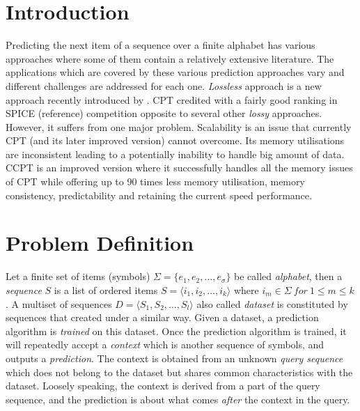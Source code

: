 \begin{comment}
							

\end{comment}

\section{Introduction}
Predicting the next item of a sequence over a finite alphabet has various approaches where some of them contain a relatively extensive literature. The applications which are covered by these various prediction approaches vary and different challenges are addressed for each one. \emph{Lossless} approach is a new approach  recently introduced by \citeauthor{gueniche_fournier-viger_tseng_2013} \citeyear{gueniche_fournier-viger_tseng_2013}. CPT credited with a fairly good ranking in SPICE (reference) competition opposite to several other \emph{lossy} approaches. However, it suffers from one major problem. Scalability is an issue that currently CPT (and its later improved version) cannot overcome. Its memory utilisations are inconsistent leading to a potentially inability to handle big amount of data. CCPT is an improved version where it successfully handles all the memory issues of CPT while offering up to 90 times less memory utilisation, memory consistency, predictability and retaining the current speed performance.
\section{Problem Definition}
Let a finite set of items (symbols) \(\Sigma = \{e_1, e_2,\ldots,e_\sigma\}\) be called \emph{alphabet}, then a \emph{sequence} \(S\) is a list of ordered items \(S=\langle i_1,i_2,\ldots,i_k\rangle\) where \(i_m \in \Sigma\ for\ 1\leq m \leq k\). A multiset of sequences \(D = \langle S_1, S_2,\ldots,S_l\rangle\) also called \emph{dataset} is constituted by sequences that created under a similar way. Given a dataset, a prediction algorithm is \emph{trained} on this dataset.  Once the prediction algorithm is trained, it will repeatedly accept a \emph{context} which is another sequence of symbols, and outputs a \emph{prediction}. The context is obtained from an unknown \emph{query sequence} which does not belong to the dataset but shares common characteristics with the dataset.  Loosely speaking, the context is derived from a part of the query sequence, and the prediction is about what comes \emph{after} the context in the query.

